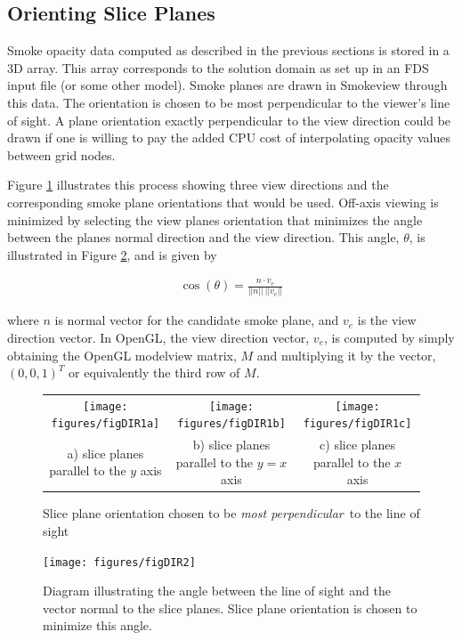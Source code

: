 {%

\subsection{Orienting Slice Planes}

Smoke opacity data computed as described in the previous sections is stored in a 3D array. This array corresponds to the solution domain as set up in an FDS input file (or some other model). Smoke planes are drawn in Smokeview through this data.  The orientation is chosen to be most perpendicular to the viewer's line of sight. A plane orientation exactly perpendicular to the view direction could be drawn if one is willing to pay the added CPU cost of interpolating opacity values between grid nodes.

Figure \ref{figDIRA} illustrates this process showing three view directions and the corresponding smoke plane orientations that would be used. Off-axis viewing is minimized by selecting the view planes orientation that minimizes the angle between the planes normal direction and the view direction. This angle, $\theta$, is illustrated in Figure \ref{figDIRB}, and is given by

\begin{eqnarray*}
\cos(\theta)=\frac{n\cdot v_e}{||n||~||v_e||}
\end{eqnarray*}

\noindent where $n$ is normal vector for the candidate smoke plane, and $v_e$ is the view direction vector.  In OpenGL, the view direction vector, $v_e$, is computed by simply obtaining the OpenGL modelview matrix, $M$ and multiplying it by the vector, $(0,0,1)^T$ or equivalently the third row of $M$.

\begin{figure}
\begin{tabular}{ccc}
\texttt{[image: figures/figDIR1a]}&
\texttt{[image: figures/figDIR1b]}&
\texttt{[image: figures/figDIR1c]}\\
a) slice planes parallel to the $y$ axis& b) slice planes parallel to
the $y=x$ axis&
c) slice planes parallel to the $x$ axis\\
\end{tabular}
\caption{Slice plane orientation chosen to be {\em most perpendicular}\ to the line of sight }
\label{figDIRA}
\end{figure}

\begin{figure}
\centerline{\texttt{[image: figures/figDIR2]}}
\caption[Diagram illustrating the angle between the line of sight
and the vector normal to the slice planes.]{Diagram illustrating the angle between the line of sight
and the vector normal to the slice planes.  Slice plane orientation is chosen to minimize
this angle.} \label{figDIRB}
\end{figure}

}
